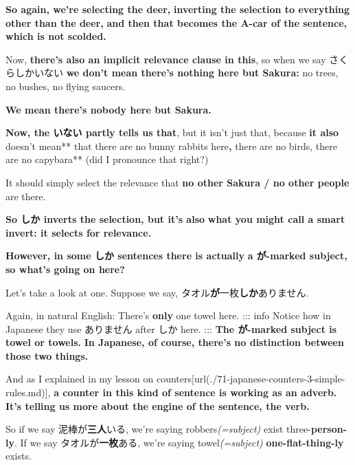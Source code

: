 {}

{\bf So again, we're selecting the deer,} {\bf inverting the selection to everything other than the deer,} {\bf and then that becomes the A-car of the sentence, which is not scolded.}

\thinrule

Now, {\bf there's also an implicit relevance clause in this}, so when we say さくらしかいない {\bf we don't mean there's nothing here but Sakura:} no trees, no bushes, no flying saucers.

{\bf We mean there's nobody here but Sakura.}

{}

{\bf Now, the いない partly tells us that}, but it isn't just that, because {\bf it also }doesn't mean** that there are no bunny rabbits here{\bf , }there are no birds, there are no capybara** (did I pronounce that right?)

{}

It should simply select the relevance that {\bf no other Sakura / no other people} are there.

{\bf So しか inverts the selection, but it's also} {\bf what you might call a smart invert: it selects for relevance.}

\stopsectionlevel

\startsectionlevel[title={しか in sentences with が-marked subject},reference={しか-in-sentences-with-が-marked-subject}]

{\bf However, in some しか sentences there is actually} {\bf a が-marked subject, so what's going on here?}

{}

Let's take a look at one. Suppose we say, タオル{\bf が}一枚{\bf しか}ありません.

Again, in natural English: There's {\bf only} one towel here. ::: info Notice how in Japanese they use ありません after しか here. ::: {\bf The が-marked subject is towel or towels.} {\bf In Japanese, of course, there's no distinction between those two things.}

And as I explained in my lesson on counters\goto{{[}71{]}}[url(./71-japanese-counters-3-simple-rules.md)], {\bf a counter in this kind of sentence is working as an adverb.} {\bf It's telling us more about the engine of the sentence, the verb.}

So if we say 泥棒が{\bf 三人}いる, we're saying robbers{\em (=subject)} exist three-{\bf person-ly}. If we say タオルが{\bf 一枚}ある, we're saying towel{\em (=subject)} {\bf one-flat-thing-ly} exists.

